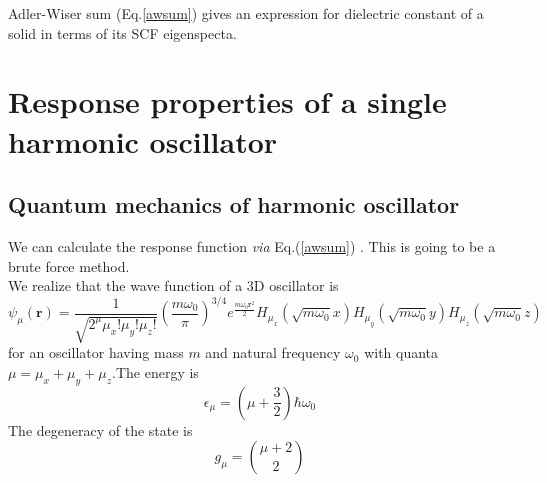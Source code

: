 \documentclass[jcp,groupaddress]{revtex4-1}
\newcommand{\eq}{\begin{equation}}
\newcommand{\qe}{\end{equation}}
\newcommand{\lp}{\left(}
\newcommand{\rp}{\right)}
\newcommand{\rr}{\mathbf{r}}
\newcommand{\fact}[1]{#1!}
\newcommand{\eqnref}[1]{
Eq.(\ref{#1})
}
\newcommand{\via}{\emph{via }}
\begin{document}
 Adler-Wiser sum (Eq.\eqref{awsum}) gives an expression for dielectric constant of a solid in terms of its SCF eigenspecta. 


\section{Response properties of a single harmonic oscillator}
 \subsection{Quantum mechanics of harmonic oscillator}
  We can calculate the response function \via \eqnref{awsum}. This is going to be a brute force method.\\
We realize that the wave function of a 3D oscillator is 
\eq\label{shof}
 \psi_{\mu}(\rr) = \frac{1}{\sqrt{2^{\mu}\fact{\mu_{x}}\fact{\mu_{y}}\fact{\mu_{z}}}}\lp\frac{m \omega_{0}}{\pi} \rp^{3/4}
e^{\frac{m \omega_{0}\rr^{2}}{2}}H_{\mu_{x}}(\sqrt{m \omega_{0}}x)H_{\mu_{y}}(\sqrt{m \omega_{0}}y)H_{\mu_{z}}(\sqrt{m \omega_{0}}z)
\qe
for an oscillator having mass $m$ and natural frequency $\omega_{0}$ with quanta $\mu = \mu_{x} + \mu_{y} + \mu_{z}$.The energy is 
\eq\label{3den}
 \epsilon_{\mu} = \left(\mu + \frac{3}{2}\right)\hbar \omega_{0}
\qe
The degeneracy of the state is 
\eq
 g_{\mu} = \binom{\mu+2}{2}
\qe
\end{document}
